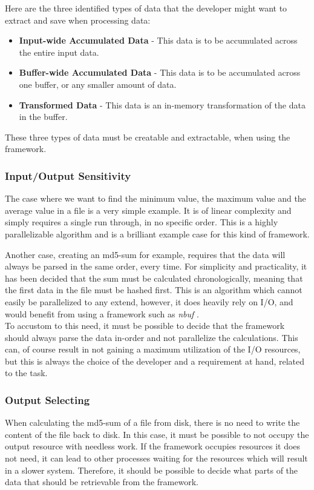 \documentclass[a4paper]{article}
\newcommand{\nbuf}{\textit{nbuf} }
\begin{document}
Here are the three identified types of data that the developer might want to extract and save when processing data:
\begin{itemize}
\item \textbf{Input-wide Accumulated Data} - This data is to be accumulated across the entire input data.
\item \textbf{Buffer-wide Accumulated Data} - This data is to be accumulated across one buffer, or any smaller amount of data.
\item \textbf{Transformed Data} - This data is an in-memory transformation of the data in the buffer.
\end{itemize}

These three types of data must be creatable and extractable, when using the framework.


\subsubsection{Input/Output Sensitivity}
The case where we want to find the minimum value, the maximum value and the average value in a file is a very simple example. It is of linear complexity and simply requires a single run through, in no specific order. This is a highly parallelizable algorithm and is a brilliant example case for this kind of framework. 

Another case, creating an md5-sum for example, requires that the data will always be parsed in the same order, every time. For simplicity and practicality, it has been decided that the sum must be calculated chronologically, meaning that the first data in the file must be hashed first. This is an algorithm which cannot easily be parallelized to any extend, however, it does heavily rely on I/O, and would benefit from using a framework such as \nbuf.\\

To accustom to this need, it must be possible to decide that the framework should always parse the data in-order and not parallelize the calculations. This can, of course result in not gaining a maximum utilization of the I/O resources, but this is always the choice of the developer and a requirement at hand, related to the task. 


\subsubsection{Output Selecting}
When calculating the md5-sum of a file from disk, there is no need to write the content of the file back to disk. In this case, it must be possible to not occupy the output resource with needless work. If the framework occupies resources it does not need, it can lead to other processes waiting for the resources which will result in a slower system. Therefore, it should be possible to decide what parts of the data that should be retrievable from the framework.
\end{document}
